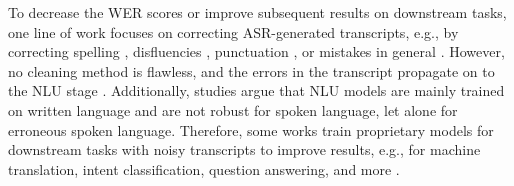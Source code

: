 To decrease the WER scores or improve subsequent results on downstream tasks, one line of work focuses on correcting ASR-generated transcripts, e.g., by correcting spelling \citep{guo2019cleaning, dutta2022errorcorrectionasrusing}, disfluencies \citep{Stouten2006cleaning}, punctuation \citep{di-gangi-etal-2019-robust}, or mistakes in general \citep{leng-etal-2021-fastcorrect-2, guo2023cleaning}.
However, no cleaning method is flawless, and the errors in the transcript propagate on to the NLU stage \citep{Errattahi2018correction}. 
Additionally, studies \citep{gopalakrishnan2020dialog, kim2021robust} argue that NLU models are mainly trained on written language and are not robust for spoken language, let alone for erroneous spoken language.
Therefore, some works train proprietary models for downstream tasks with noisy transcripts to improve results, e.g., for machine translation, intent classification, question answering, and more \citep{fang2020phoneme, cui2021approachimproverobustnessnlp, liu-etal-2021-robustness, feng22c_interspeech, jung-etal-2024-interventional}.

